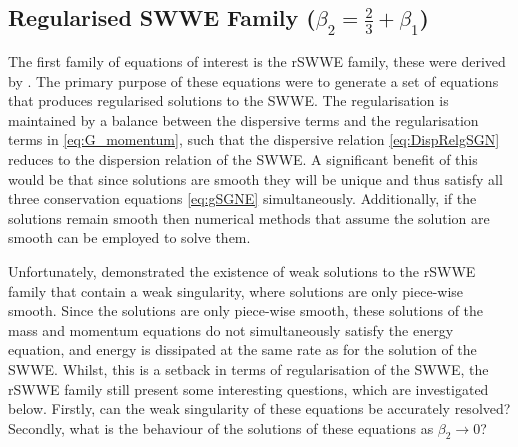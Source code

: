 \documentclass[10pt]{elsarticle}
\begin{document}
\subsection{Regularised SWWE Family ($\beta_2 = \frac{2}{3} + \beta_1$)}
The first family of equations of interest is the rSWWE family, these were derived by \citet{Clamond-Dutykh-2018-237}. The primary purpose of these equations were to generate a set of equations that produces regularised solutions to the SWWE. The regularisation is maintained by a balance between the dispersive terms and the regularisation terms in \eqref{eq:G_momentum}, such that the dispersive relation \eqref{eq:DispRelgSGN} reduces to the dispersion relation of the SWWE. A significant benefit of this would be that since solutions are smooth they will be unique and thus satisfy all three conservation equations \eqref{eq:gSGNE} simultaneously. Additionally, if the solutions remain smooth then numerical methods that assume the solution are smooth can be employed to solve them.

Unfortunately, \citet{Pu-2018-1361} demonstrated the existence of weak solutions to the rSWWE family that contain a weak singularity, where solutions are only piece-wise smooth. Since the solutions are only piece-wise smooth, these solutions of the mass and momentum equations do not simultaneously satisfy the energy equation, and energy is dissipated at the same rate as for the solution of the SWWE. Whilst, this is a setback in terms of regularisation of the SWWE, the rSWWE family still present some interesting questions, which are investigated below. Firstly, can the weak singularity of these equations be accurately resolved? Secondly, what is the behaviour of the solutions of these equations as $\beta_2 \rightarrow 0$? 
\end{document}
